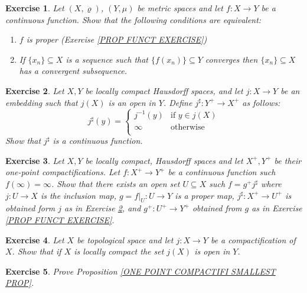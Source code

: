 \documentclass[11pt, letterpaper, oneside]{report}
\theoremstyle{pplain}
\newtheorem{ITERMVALUE THM}[theorem]{Intermediate Value Theorem}
\newtheorem{HEINEBOREL THM}[theorem]{Heine-Borel Theorem}
\newtheorem{UMETR THM}[theorem]{Urysohn Metrization Theorem}
\newtheorem{UMETR2 THM}[theorem]{Urysohn Metrization Theorem (v.2)}
\theoremstyle{ddefinition}
\theoremstyle{nnn}
\newtheorem{TDA NN}[theorem]{Topological Data Analysis. }
\theoremstyle{eexercise}
\newtheorem{exercise}{Exercise}[chapter]
\newcommand{\benu}{\begin{enumerate}}
\newcommand{\eenu}{\end{enumerate}}
\begin{document}
\begin{exercise}
Let $(X, \varrho)$, $(Y, \mu)$ be metric spaces and let $f\colon X \to Y$ be a continuous function. 
Show that the following conditions are equivalent:
\benu
\item $f$ is proper (Exercise \ref{PROP FUNCT EXERCISE})
\item If $\{x_{n}\}\subseteq X$ is a sequence such that $\{f(x_{n})\} \subseteq Y$ converges then 
$\{x_{n}\}\subseteq X$ has a convergent subsequence. 
\eenu
\end{exercise} 



 
 
\begin{exercise}
\label{EMBEDDING ONE POINT COMPT EXERCISE}
Let $X, Y$ be locally compact Hausdorff  spaces, and let $j\colon X \to Y$ be an embedding such that 
$j(X)$ is an open in $Y$. Define $j^{{\sharp}}: Y^{+} \to X^{+}$ as follows: 
$$j^{{\sharp}}(y) = 
\begin{cases}
j^{-1}(y) & {\text{if }} y\in j(X) \\
\infty &  {\text{otherwise}} \\
\end{cases}
$$
Show that $j^{{\sharp}}$ is a continuous function.
\end{exercise}  
  
\begin{exercise}
Let $X, Y$ be locally compact, Hausdorff spaces and let $X^{+}, Y^{+}$ be their one-point compactifications. 
Let $f\colon X^{+}\to Y^{+}$ be a continuous function such $f(\infty) = \infty$. Show that there exists 
an open set $U\subseteq X$ such $f = g^{+}j^{{\sharp}}$ where  $j\colon U \to X$ is the inclusion map, 
 $g = f|_{U}\colon U \to Y$  is a proper map,   $j^{{\sharp}} \colon X^{+} \to U^{+}$ is obtained form $j$ 
as in Exercise \ref{EMBEDDING ONE POINT COMPT EXERCISE}, 
and  $g^{+} \colon U^{+}\to Y^{+}$ obtained from $g$  as in Exercise \ref{PROP FUNCT EXERCISE}.
\end{exercise}
  
  
\begin{exercise}
\label{LOC COMPACT OPEN COMPACTIFIC EXERCISE}
Let $X$ be topological space and let $j\colon X \to Y$ be a compactification of $X$. Show that
if $X$ is locally compact the set $j(X)$ is  open in $Y$. 
\end{exercise}  


 
  
  
\begin{exercise}
Prove Proposition \ref{ONE POINT COMPACTIFI SMALLEST PROP}. 
\end{exercise}
\end{document}

